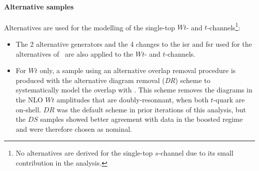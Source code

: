 \paragraph{Alternative samples} Alternatives are used for the modelling of the single-top $Wt$- and $t$-channels\footnote{No alternatives are derived for the single-top $s$-channel due to its small contribution in the analysis.}:
\begin{itemize}
  \item The 2 alternative generators and the 4 changes to the \gls{isr} and \gls{fsr} used for the alternatives of \ttb\ are also applied to the $Wt$- and $t$-channels.
  \item For $Wt$ only, a sample using an alternative overlap removal procedure is produced with the alternative diagram removal (\textit{DR}) scheme \cite{StefanoFrixione_2008} to systematically model the overlap with \ttb. This scheme removes the diagrams in the NLO $Wt$ amplitudes that are doubly-resonnant, when both $t$-quark are on-shell. $DR$ was the default scheme in prior iterations of this analysis, but the $DS$ samples showed better agreement with data in the boosted regime and were therefore chosen as nominal.
\end{itemize}

